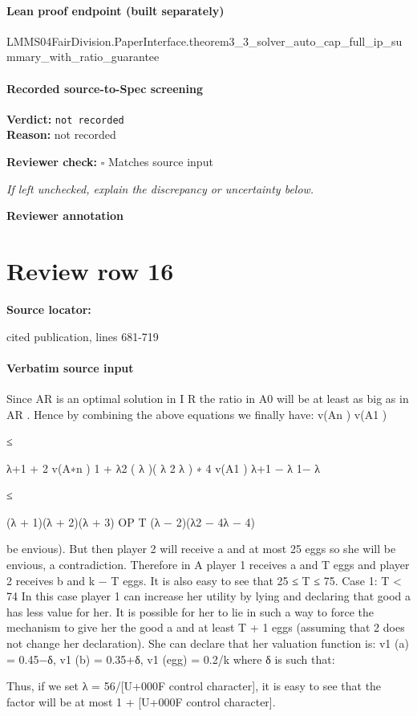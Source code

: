 \documentclass[10pt]{article}
\newcommand{\reviewerbox}{%
  \par\noindent\fbox{\parbox{0.96\linewidth}{\rule{0pt}{0.38in}}}\par
}
\newcommand{\reviewmatch}[1]{%
  \par\noindent\textbf{Reviewer check:} $\square$\; #1\par
  \noindent\emph{If left unchecked, explain the discrepancy or uncertainty below.}\par
}
\begin{document}
\paragraph{Lean proof endpoint (built separately)}\begin{ReviewVerbatim}
LMMS04FairDivision.PaperInterface.theorem3_3_solver_auto_cap_full_ip_summary_with_ratio_guarantee
\end{ReviewVerbatim}

\paragraph{Recorded source-to-Spec screening}
\textbf{Verdict:} \texttt{not recorded}
\\
\textbf{Reason:} not recorded
\reviewmatch{Matches source input}
\noindent\textbf{Reviewer annotation}\par
\reviewerbox
\clearpage
\hypertarget{source-claim-d452afafcd482e19}{}
\section*{Review row 16}
\textbf{Source locator:} {\footnotesize\raggedright cited publication, lines 681-\allowbreak{}719\par}
\paragraph{Verbatim source input}
\begin{ReviewVerbatim}
Since AR is an optimal solution in I R the ratio in A0 will
be at least as big as in AR . Hence by combining the above
equations we finally have:
v(An )
v(A1 )

≤

λ+1
+ 2
v(A∗n ) 1 + λ2
( λ
)( λ 2 λ )
∗
4
v(A1 ) λ+1 − λ
1− λ

≤

(λ + 1)(λ + 2)(λ + 3)
OP T
(λ − 2)(λ2 − 4λ − 4)

be envious). But then player 2 will receive a and at most 25
eggs so she will be envious, a contradiction. Therefore in A
player 1 receives a and T eggs and player 2 receives b and
k − T eggs. It is also easy to see that 25 ≤ T ≤ 75.
Case 1: T < 74
In this case player 1 can increase her utility by lying and
declaring that good a has less value for her. It is possible for
her to lie in such a way to force the mechanism to give her
the good a and at least T + 1 eggs (assuming that 2 does not
change her declaration). She can declare that her valuation
function is: v1 (a) = 0.45−δ, v1 (b) = 0.35+δ, v1 (egg) = 0.2/k
where δ is such that:

Thus, if we set λ = 56/[U+000F control character], it is easy to see that the factor
will be at most 1 + [U+000F control character].
\end{ReviewVerbatim}
\end{document}
